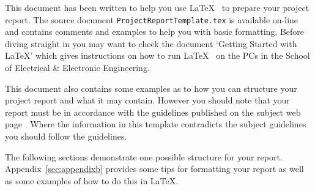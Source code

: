 

This document has been written to help you use \LaTeX~ to prepare your
project report. The source document \texttt{ProjectReportTemplate.tex}
is available on-line \cite{Phillips04} and contains comments and
examples to help you with basic formatting. Before diving straight in
you may want to check the document `Getting Started with \LaTeX'
\cite{Phillips04a} which gives instructions on how to run \LaTeX~ on
the PCs in the School of Electrical \& Electronic Engineering.

This document also contains some examples as to how you can structure
your project report and what it may contain. However you should note
that your report must be in accordance with the guidelines published
on the subject web page \cite{Green04}. Where the information in this
template contradicts the subject guidelines you should follow the
guidelines.

The following sections demonstrate one possible structure for your
report. Appendix~\ref{sec:appendixb} provides some tips for formatting
your report as well as some examples of how to do this in \LaTeX.

